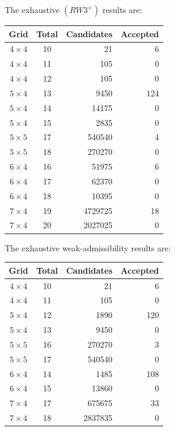 The exhaustive $(RW3^+)$ results are:
\begin{center}
\begin{tabular}{ccrr}
\toprule
Grid & Total & Candidates & Accepted\\
\midrule
$4\times4$ & 10 & 21 & 6\\
$4\times4$ & 11 & 105 & 0\\
$4\times4$ & 12 & 105 & 0\\
$5\times4$ & 13 & 9450 & 124\\
$5\times4$ & 14 & 14175 & 0\\
$5\times4$ & 15 & 2835 & 0\\
$5\times5$ & 17 & 540540 & 4\\
$5\times5$ & 18 & 270270 & 0\\
$6\times4$ & 16 & 51975 & 6\\
$6\times4$ & 17 & 62370 & 0\\
$6\times4$ & 18 & 10395 & 0\\
$7\times4$ & 19 & 4729725 & 18\\
$7\times4$ & 20 & 2027025 & 0\\
\bottomrule
\end{tabular}
\end{center}
The exhaustive weak-admissibility results are:
\begin{center}
\begin{tabular}{ccrr}
\toprule
Grid & Total & Candidates & Accepted\\
\midrule
$4\times4$ & 10 & 21 & 6\\
$4\times4$ & 11 & 105 & 0\\
$5\times4$ & 12 & 1890 & 120\\
$5\times4$ & 13 & 9450 & 0\\
$5\times5$ & 16 & 270270 & 3\\
$5\times5$ & 17 & 540540 & 0\\
$6\times4$ & 14 & 1485 & 108\\
$6\times4$ & 15 & 13860 & 0\\
$7\times4$ & 17 & 675675 & 33\\
$7\times4$ & 18 & 2837835 & 0\\
\bottomrule
\end{tabular}
\end{center}
